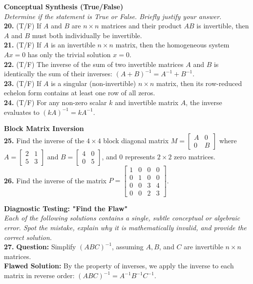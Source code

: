 \documentclass{article}
\begin{document}
\vspace{10pt}
\noindent
\textbf{Conceptual Synthesis (True/False)} \\
\textit{Determine if the statement is True or False. Briefly justify your answer.} \\
\textbf{20.} (T/F) If $A$ and $B$ are $n \times n$ matrices and their product $AB$ is invertible, then $A$ and $B$ must both individually be invertible. \\
\textbf{21.} (T/F) If $A$ is an invertible $n \times n$ matrix, then the homogeneous system $Ax = 0$ has only the trivial solution $x = 0$. \\
\textbf{22.} (T/F) The inverse of the sum of two invertible matrices $A$ and $B$ is identically the sum of their inverses: $(A+B)^{-1} = A^{-1} + B^{-1}$. \\
\textbf{23.} (T/F) If $A$ is a singular (non-invertible) $n \times n$ matrix, then its row-reduced echelon form contains at least one row of all zeros. \\
\textbf{24.} (T/F) For any non-zero scalar $k$ and invertible matrix $A$, the inverse evaluates to $(kA)^{-1} = k A^{-1}$.

\vspace{10pt}
\noindent
\textbf{Block Matrix Inversion} \\
\textbf{25.} Find the inverse of the $4 \times 4$ block diagonal matrix $M = \begin{bmatrix} A & 0 \\ 0 & B \end{bmatrix}$ where $A = \begin{bmatrix} 2 & 1 \\ 5 & 3 \end{bmatrix}$ and $B = \begin{bmatrix} 4 & 0 \\ 0 & 5 \end{bmatrix}$, and $0$ represents $2 \times 2$ zero matrices. \\
\textbf{26.} Find the inverse of the matrix $P = \begin{bmatrix} 1 & 0 & 0 & 0 \\ 0 & 1 & 0 & 0 \\ 0 & 0 & 3 & 4 \\ 0 & 0 & 2 & 3 \end{bmatrix}$. 

\vspace{10pt}
\noindent
\textbf{Diagnostic Testing: "Find the Flaw"} \\
\textit{Each of the following solutions contains a single, subtle conceptual or algebraic error. Spot the mistake, explain why it is mathematically invalid, and provide the correct solution.} \\
\textbf{27.} \textbf{Question:} Simplify $(ABC)^{-1}$, assuming $A, B$, and $C$ are invertible $n \times n$ matrices. \\
\textbf{Flawed Solution:} By the property of inverses, we apply the inverse to each matrix in reverse order: $(ABC)^{-1} = A^{-1} B^{-1} C^{-1}$. 
\end{document}
